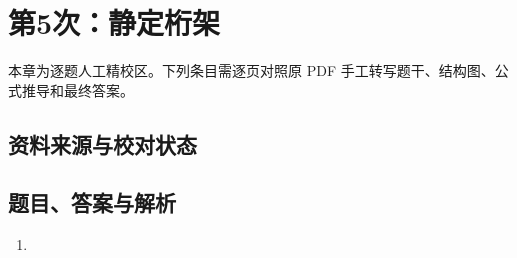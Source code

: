 \chapter{第5次：静定桁架}

本章为逐题人工精校区。下列条目需逐页对照原 PDF 手工转写题干、结构图、公式推导和最终答案。

\section{资料来源与校对状态}


\section{题目、答案与解析}

\begin{enumerate}[label=\textbf{第\arabic*题},wide]
  \item
  \begin{problemBox}
  \end{problemBox}

  \begin{solutionBox}
  \end{solutionBox}
\end{enumerate}
